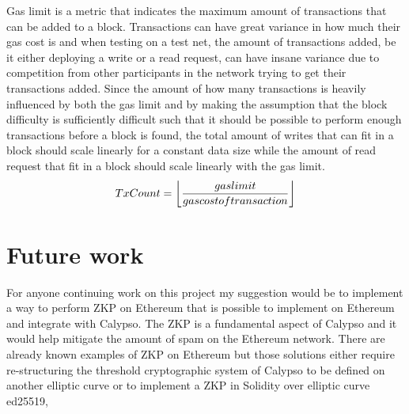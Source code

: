 \documentclass[12pt]{article}
\DeclarePairedDelimiter\floor{\lfloor}{\rfloor}
\begin{document}
Gas limit is a metric that indicates the maximum amount of transactions that can be added to a block. Transactions can have great variance in how much their gas cost is and when testing on a test net, the amount of transactions added, be it either deploying a write or a read request, can have insane variance due to competition from other participants in the network trying to get their transactions added. Since the amount of how many transactions is heavily influenced by both the gas limit and by making the assumption that the block difficulty is sufficiently difficult such that it should be possible to perform enough transactions before a block is found, the total amount of writes that can fit in a block should scale linearly for a constant data size while the amount of read request that fit in a block should scale linearly with the gas limit.
\begin{equation}
    TxCount = \floor*{\frac{gaslimit}{gascostoftransaction}}
    \label{eq:Equation for gas cost}
\end{equation}


\section{Future work}


For anyone continuing work on this project my suggestion would be to implement a way to perform ZKP on Ethereum that is possible to implement on Ethereum and integrate with Calypso. The ZKP is a fundamental aspect of Calypso and it would help mitigate the amount of spam on the Ethereum network. There are already known examples of ZKP on Ethereum but those solutions either require re-structuring the threshold cryptographic system of Calypso to be defined on another elliptic curve or to implement a ZKP in Solidity over elliptic curve ed25519,
\end{document}
